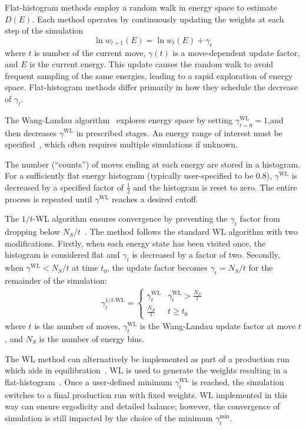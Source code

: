 \documentclass[letterpaper,twocolumn,amsmath,amssymb,pre,aps,10pt]{revtex4-1}
\begin{document}
Flat-histogram methods employ a random walk in energy space to estimate $D(E)$.  Each method operates by continuously updating the weights at each
step of the simulation
\begin{equation}
	\ln{w_{t+1}(E)}=\ln{w_{t}(E)}
	+\gamma_t
\end{equation}
where $t$ is number of the current move, $\gamma(t)$ is a move-dependent update
factor, and $E$ is the current energy.  This update causes the random walk to
avoid frequent sampling of the same energies, leading to a rapid exploration
of energy space. Flat-histogram methods differ primarily in how they schedule
the decrease of $\gamma_t$.

The Wang-Landau algorithm~\cite{wang2001efficient,wang2001determining,
landau2014guide} explores energy space by setting $\gamma_{t=0}^{\text{WL}}=1$,and then decreases $\gamma^{\text{WL}}$ in prescribed stages. An energy range of
interest must be specified~\cite{wang2001efficient, schulz2003avoiding,yan2003fast}, which often requires multiple simulations if unknown.

The number (``counts'') of moves ending at each energy are stored in a
histogram.  For a sufficiently flat energy histogram (typically user-specified to be 0.8), $\gamma^{\text{WL}}$ is decreased by a specified factor of $\frac12$ and the histogram is reset to zero. The entire process is repeated until $\gamma^{\text{WL}}$ reaches a desired cutoff.

The $1/t$-WL algorithm ensures convergence by preventing the $\gamma_t$ factor
from dropping below $N_S/t$~\cite{belardinelli2008analysis,
schneider2017convergence}. The method follows the standard WL algorithm with two
modifications.  Firstly, when each energy state has been visited once, the histogram is considered flat and $\gamma_t$ is
decreased by a factor of two. Secondly, when
$\gamma^{\text{WL}} < N_S/t$ at time $t_0$, the update factor becomes
$\gamma_t = N_S/t$ for the remainder of the simulation:
\begin{align}
  \gamma_t^{1/t\text{-WL}} = \begin{cases}
     \gamma^{\text{WL}}_t & \gamma^{\text{WL}}_t > \frac{N_S}{t} \\
     \frac{N_S}{t} & t \ge t_0
 \end{cases}
\end{align}
where $t$ is the number of moves, $\gamma^{\text{WL}}_t$ is the Wang-Landau update factor
at move $t$, and $N_S$ is the number of energy bins.

The WL method can alternatively be implemented as part of a production run which aids in
equilibration~\cite{gross2018massively}. WL is used to generate the weights
resulting in a flat-histogram~\cite{janke2017generalized}. Once a user-defined
minimum $\gamma^{\text{WL}}_t$ is reached, the simulation switches to a final production run
with fixed weights. WL implemented in this way can ensure ergodicity and
detailed balance; however, the convergence of simulation is still impacted by
the choice of the minimum $\gamma^{\min}_t$.
\end{document}
